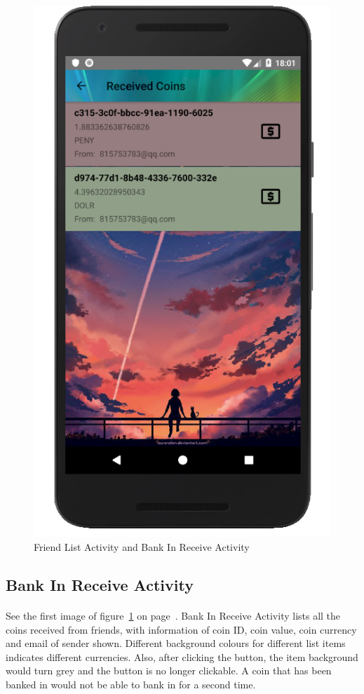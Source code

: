 \documentclass[12pt]{article}
\begin{document}
\begin{figure}
	\includegraphics[scale=0.25]{ReceivedCoin.png}
	\caption{\label{fig:friend}Friend List Activity and Bank In Receive Activity}
\end{figure}

\subsection{Bank In Receive Activity}
\paragraph{}
See the first image of figure~\ref{fig:friend} on page~\pageref{fig:friend}. Bank In Receive Activity lists all the coins received from friends, with information of coin ID, coin value, coin currency and email of sender shown. Different background colours for different list items indicates different currencies. Also, after clicking the button, the item background would turn grey and the button is no longer clickable. A coin that has been banked in would not be able to bank in for a second time.
\end{document}
